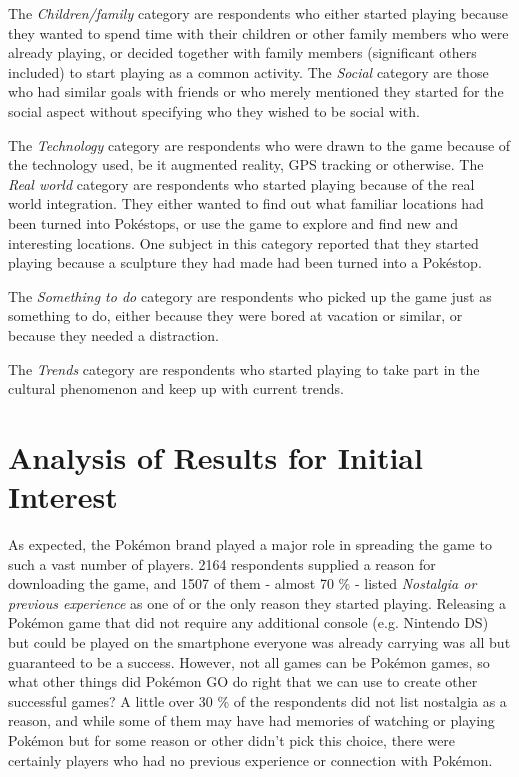 The \emph{Children/family} category are respondents who either started playing because they wanted to spend time with their children or other family members who were already playing, or decided together with family members (significant others included) to start playing as a common activity. The \emph{Social} category are those who had similar goals with friends or who merely mentioned they started for the social aspect without specifying who they wished to be social with.

The \emph{Technology} category are respondents who were drawn to the game because of the technology used, be it augmented reality, GPS tracking or otherwise. The \emph{Real world} category are respondents who started playing because of the real world integration. They either wanted to find out what familiar locations had been turned into Pokéstops, or use the game to explore and find new and interesting locations. One subject in this category reported that they started playing because a sculpture they had made had been turned into a Pokéstop.

The \emph{Something to do} category are respondents who picked up the game just as something to do, either because they were bored at vacation or similar, or because they needed a distraction.

The \emph{Trends} category are respondents who started playing to take part in the cultural phenomenon and keep up with current trends.


\section{Analysis of Results for Initial Interest}
\label{sec:success-factors-initial-interest-analysis}

As expected, the Pokémon brand played a major role in spreading the game to such a vast number of players. 2164 respondents supplied a reason for downloading the game, and 1507 of them - almost 70 \% - listed \emph{Nostalgia or previous experience} as one of or the only reason they started playing. Releasing a Pokémon game that did not require any additional console (e.g. Nintendo DS) but could be played on the smartphone everyone was already carrying was all but guaranteed to be a success. However, not all games can be Pokémon games, so what other things did Pokémon GO do right that we can use to create other successful games? A little over 30 \% of the respondents did not list nostalgia as a reason, and while some of them may have had memories of watching or playing Pokémon but for some reason or other didn't pick this choice, there were certainly players who had no previous experience or connection with Pokémon.

